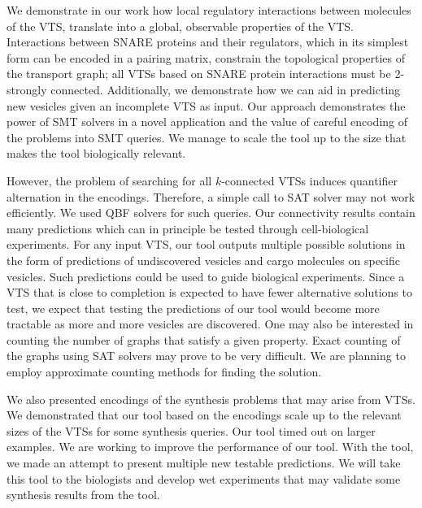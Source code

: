 \noindent 
We demonstrate in our work how local regulatory interactions between molecules of the VTS, translate into a global, observable properties of the VTS. 
%
Interactions between SNARE proteins and their regulators, which in its simplest form can be encoded in a pairing matrix, constrain the topological properties of the transport graph; all VTSs based on SNARE protein interactions must be 2-strongly connected. 
%
Additionally, we demonstrate how we can aid in predicting new vesicles given an incomplete VTS as input. 
%
Our approach demonstrates the power of SMT solvers in a novel application and the value of careful encoding of the problems into SMT queries. 
%
We manage to scale the tool up to the size that makes the tool biologically relevant.
%
%

However, the problem of searching for all $k$-connected VTSs induces quantifier alternation in the encodings. 
%
Therefore, a simple call to SAT solver may not work efficiently. 
%
We used QBF solvers for such queries. Our connectivity results contain many predictions which can in principle be tested through cell-biological experiments. 
%
For any input VTS, our tool outputs multiple possible solutions in the form of predictions of undiscovered vesicles and cargo molecules on specific vesicles. 
%
Such predictions could be used to guide biological experiments. Since a VTS that is close to completion is expected to have fewer alternative solutions to test, we expect that testing the predictions of our tool would become more tractable as more and more vesicles are discovered. 
%
One may also be interested in counting the number of graphs that satisfy a given property. 
%
Exact counting of the graphs using SAT solvers may prove to be very difficult. We are planning to employ approximate counting methods for finding the solution.

We also presented encodings of the synthesis problems that may arise from VTSs.
%
We demonstrated that our tool based on the encodings
scale up to the relevant sizes of the VTSs for some synthesis queries.
%
Our tool timed out on larger examples.
%
We are working to improve the performance of our tool.
%
%
With the tool, we made an attempt to present multiple new testable predictions. 
%
We will take this tool to the biologists and develop wet experiments that may
validate some synthesis results from the tool.
%
%

